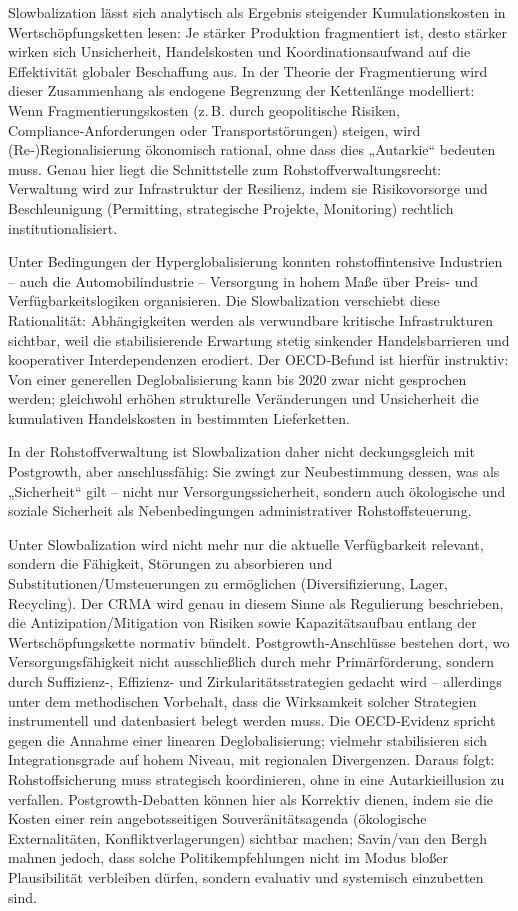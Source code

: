\documentclass[12pt,a4paper,oneside]{book} %
\begin{document}
Slowbalization lässt sich analytisch als Ergebnis steigender Kumulationskosten in Wertschöpfungsketten lesen: Je stärker Produktion fragmentiert ist, desto stärker wirken sich Unsicherheit, Handelskosten und Koordinationsaufwand auf die Effektivität globaler Beschaffung aus.  In der Theorie der Fragmentierung wird dieser Zusammenhang als endogene Begrenzung der Kettenlänge modelliert: Wenn Fragmentierungskosten (z. B. durch geopolitische Risiken, Compliance‑Anforderungen oder Transportstörungen) steigen, wird (Re‑)Regionalisierung ökonomisch rational, ohne dass dies „Autarkie“ bedeuten muss.  Genau hier liegt die Schnittstelle zum Rohstoffverwaltungsrecht: Verwaltung wird zur Infrastruktur der Resilienz, indem sie Risikovorsorge und Beschleunigung (Permitting, strategische Projekte, Monitoring) rechtlich institutionalisiert.

Unter Bedingungen der Hyperglobalisierung konnten rohstoffintensive Industrien – auch die Automobilindustrie – Versorgung in hohem Maße über Preis- und Verfügbarkeitslogiken organisieren. Die Slowbalization verschiebt diese Rationalität: Abhängigkeiten werden als verwundbare kritische Infrastrukturen sichtbar, weil die stabilisierende Erwartung stetig sinkender Handelsbarrieren und kooperativer Interdependenzen erodiert.  Der OECD‑Befund ist hierfür instruktiv: Von einer generellen Deglobalisierung kann bis 2020 zwar nicht gesprochen werden; gleichwohl erhöhen strukturelle Veränderungen und Unsicherheit die kumulativen Handelskosten in bestimmten Lieferketten.

In der Rohstoffverwaltung ist Slowbalization daher nicht deckungsgleich mit Postgrowth, aber anschlussfähig: Sie zwingt zur Neubestimmung dessen, was als „Sicherheit“ gilt – nicht nur Versorgungssicherheit, sondern auch ökologische und soziale Sicherheit als Nebenbedingungen administrativer Rohstoffsteuerung.

Unter Slowbalization wird nicht mehr nur die aktuelle Verfügbarkeit relevant, sondern die Fähigkeit, Störungen zu absorbieren und Substitutionen/Umsteuerungen zu ermöglichen (Diversifizierung, Lager, Recycling).  Der CRMA wird genau in diesem Sinne als Regulierung beschrieben, die Antizipation/Mitigation von Risiken sowie Kapazitätsaufbau entlang der Wertschöpfungskette normativ bündelt.  Postgrowth‑Anschlüsse bestehen dort, wo Versorgungsfähigkeit nicht ausschließlich durch mehr Primärförderung, sondern durch Suffizienz-, Effizienz- und Zirkularitätsstrategien gedacht wird – allerdings unter dem methodischen Vorbehalt, dass die Wirksamkeit solcher Strategien instrumentell und datenbasiert belegt werden muss.  Die OECD‑Evidenz spricht gegen die Annahme einer linearen Deglobalisierung; vielmehr stabilisieren sich Integrationsgrade auf hohem Niveau, mit regionalen Divergenzen.  Daraus folgt: Rohstoffsicherung muss strategisch koordinieren, ohne in eine Autarkieillusion zu verfallen.  Postgrowth‑Debatten können hier als Korrektiv dienen, indem sie die Kosten einer rein angebotsseitigen Souveränitätsagenda (ökologische Externalitäten, Konfliktverlagerungen) sichtbar machen; Savin/van den Bergh mahnen jedoch, dass solche Politikempfehlungen nicht im Modus bloßer Plausibilität verbleiben dürfen, sondern evaluativ und systemisch einzubetten sind.
\end{document}
